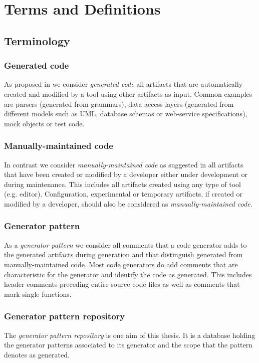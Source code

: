 
\chapter{Terms and Definitions}\label{chapter:terms}

\section{Terminology}
\subsection{Generated code}
\copied
As proposed in \cite{Alves2011} we consider \textit{generated code} all artifacts that are automatically created and modified by a tool using other artifacts as input. Common examples are parsers (generated from grammars), data access layers (generated from different models such as UML, database schemas or web-service specifications), mock objects or test code.

\subsection{Manually-maintained code}
\copied
In contrast we consider \textit{manually-maintained code} as suggested in \cite{Alves2011} all artifacts that have been created or modified by a developer either under development or during maintenance. This includes all artifacts created using any type of tool (e.g. editor). Configuration, experimental or temporary artifacts, if created or modified by a developer, should also be considered as \textit{manually-maintained code}.
\subsection{Generator pattern}
As a \textit{generator pattern} we consider all comments that a code generator adds to the generated artifacts during generation and that distinguish generated from manually-maintained code. Most code generators do add comments that are characteristic for the generator and identify the code as generated. This includes header comments preceding entire source code files as well as comments that mark single functions.

\subsection{Generator pattern repository}
The \textit{generator pattern repository} is one aim of this thesis. It is a database holding the generator patterns associated to its generator and the scope that the pattern denotes as generated.

